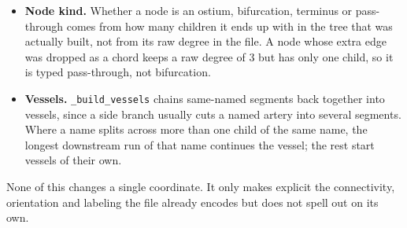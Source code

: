 \begin{itemize}
  \item \textbf{Node kind.} Whether a node is an ostium, bifurcation, terminus or pass-through
  comes from how many children it ends up with in the tree that was actually built, not from its
  raw degree in the file. A node whose extra edge was dropped as a chord keeps a raw degree of 3
  but has only one child, so it is typed pass-through, not bifurcation.

  \item \textbf{Vessels.} \texttt{\_build\_vessels} chains same-named segments back together into
  vessels, since a side branch usually cuts a named artery into several segments. Where a name
  splits across more than one child of the same name, the longest downstream run of that name
  continues the vessel; the rest start vessels of their own.
\end{itemize}

None of this changes a single coordinate. It only makes explicit the connectivity, orientation
and labeling the file already encodes but does not spell out on its own.
